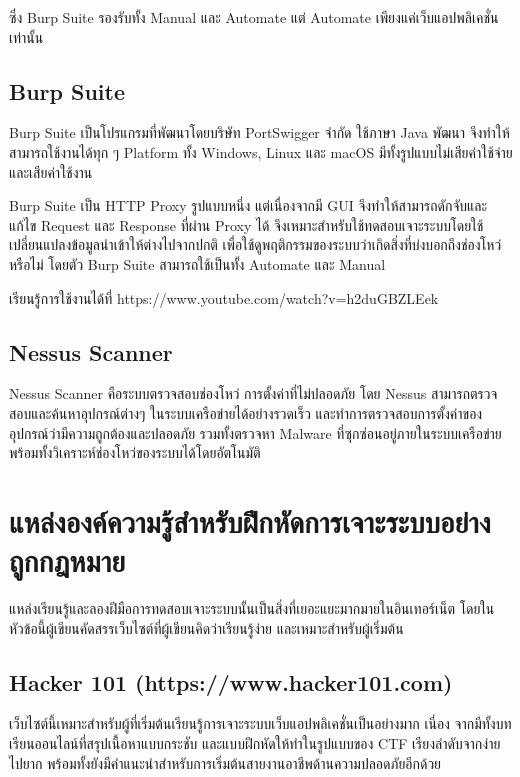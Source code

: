ซึ่ง Burp Suite รองรับทั้ง Manual และ Automate แต่ Automate เพียงแค่เว็บแอปพลิเคชั่นเท่านั้น

\subsection{Burp Suite}

Burp Suite เป็นโปรแกรมที่พัฒนาโดยบริษัท PortSwigger จำกัด ใช้ภาษา Java พัฒนา จึงทำให้สามารถใช้งานได้ทุก ๆ Platform ทั้ง Windows, Linux และ macOS มีทั้งรูปแบบไม่เสียค่าใช้จ่ายและเสียค่าใช้งาน

Burp Suite เป็น HTTP Proxy รูปแบบหนึ่ง แต่เนื่องจากมี GUI จึงทำให้สามารถดักจับและแก้ไข Request และ Response ที่ผ่าน Proxy ได้ จึงเหมาะสำหรับใช้ทดสอบเจาะระบบโดยใช้เปลี่ยนแปลงข้อมูลนำเข้าให้ต่างไปจากปกติ เพื่อใช้ดูพฤติกรรมของระบบว่าเกิดสิ่งที่บ่งบอกถึงช่องโหว่หรือไม่ โดยตัว Burp Suite สามารถใช้เป็นทั้ง Automate และ Manual

เรียนรู้การใช้งานได้ที่ https://www.youtube.com/watch?v=h2duGBZLEek

\subsection{Nessus Scanner}
Nessus Scanner คือระบบตรวจสอบช่องโหว่ การตั้งค่าที่ไม่ปลอดภัย โดย Nessus สามารถตรวจสอบและค้นหาอุปกรณ์ต่างๆ ในระบบเครือข่ายได้อย่างรวดเร็ว และทำการตรวจสอบการตั้งค่าของอุปกรณ์ว่ามีความถูกต้องและปลอดภัย รวมทั้งตรวจหา Malware ที่ซุกซ่อนอยู่ภายในระบบเครือข่ายพร้อมทั้งวิเคราะห์ช่องโหว่ของระบบได้โดยอัตโนมัติ \cite{??}

\section{แหล่งองค์ความรู้สำหรับฝึกหัดการเจาะระบบอย่างถูกกฎหมาย}

แหล่งเรียนรู้และลองฝีมือการทดสอบเจาะระบบนั้นเป็นสิ่งที่เยอะแยะมากมายในอินเทอร์เน็ต โดยในหัวข้อนี้ผู้เขียนคัดสรรเว็บไซต์ที่ผู้เขียนคิดว่าเรียนรู้ง่าย และเหมาะสำหรับผู้เริ่มต้น

\subsection{Hacker 101 (https://www.hacker101.com)}

เว็บไซต์นี้เหมาะสำหรับผู้ที่เริ่มต้นเรียนรู้การเจาะระบบเว็บแอปพลิเคชั่นเป็นอย่างมาก เนี่อง จากมีทั้งบทเรียนออนไลน์ที่สรุปเนื้อหาแบบกระชับ และแบบฝึกหัดให้ทำในรูปแบบของ CTF \cite{??} เรียงลำดับจากง่ายไปยาก พร้อมทั้งยังมีคำแนะนำสำหรับการเริ่มต้นสายงานอาชีพด้านความปลอดภัยอีกด้วย

